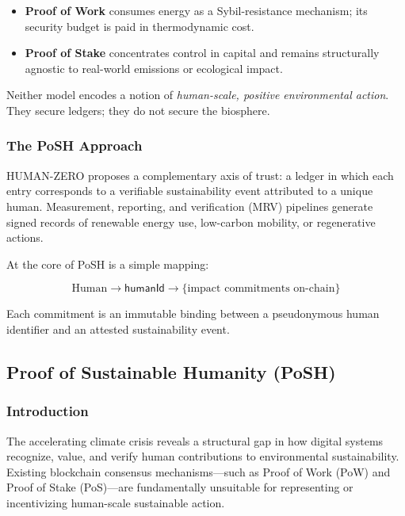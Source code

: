 \documentclass{article}
\begin{document}
\begin{itemize}
\item \textbf{Proof of Work} consumes energy as a Sybil-resistance mechanism; its security budget is paid in thermodynamic cost.
\item \textbf{Proof of Stake} concentrates control in capital and remains structurally agnostic to real-world emissions or ecological impact.
\end{itemize}

Neither model encodes a notion of \textit{human-scale, positive environmental action}. They secure ledgers; they do not secure the biosphere.

\subsubsection{The PoSH Approach}

HUMAN-ZERO proposes a complementary axis of trust: a ledger in which each entry corresponds to a verifiable sustainability event attributed to a unique human. Measurement, reporting, and verification (MRV) pipelines generate signed records of renewable energy use, low-carbon mobility, or regenerative actions.

At the core of PoSH is a simple mapping:

\begin{equation}
\text{Human} \rightarrow \mathsf{humanId} \rightarrow \{\text{impact commitments on-chain}\}
\end{equation}

Each commitment is an immutable binding between a pseudonymous human identifier and an attested sustainability event.

\subsection{Proof of Sustainable Humanity (PoSH)}

\subsubsection{Introduction}

The accelerating climate crisis reveals a structural gap in how digital systems recognize, value, and verify human contributions to environmental sustainability. Existing blockchain consensus mechanisms---such as Proof of Work (PoW) and Proof of Stake (PoS)---are fundamentally unsuitable for representing or incentivizing human-scale sustainable action.
\end{document}
